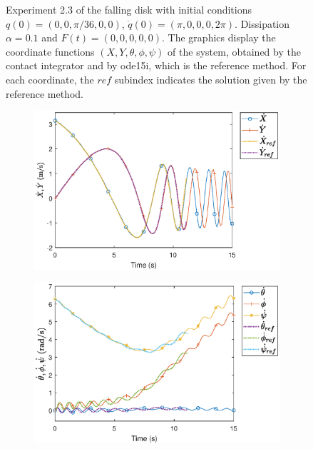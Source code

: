 \documentclass{aims}
\numberwithin{equation}{section}
\theoremstyle{definition}
\begin{document}
\begin{figure}
\begin{subfigure}[b]{0.75\textwidth}
  \end{subfigure}
  \caption{Experiment 2.3 of the falling disk with initial conditions ${q(0) = (0,0,\pi/36,0,0)}$, ${\dot{q}(0) = (\pi,0,0,0,2\pi)}$. Dissipation ${\alpha = 0.1}$ and ${F(t) = (0,0,0,0,0)}$. The graphics display the coordinate functions $(X,Y,\theta,\phi,\psi)$ of the system, obtained by the contact integrator and by ode15i, which is the reference method. For each coordinate, the $ref$ subindex indicates the solution given by the reference method.}
  \label{fig:disco_experimento_2_3_1}
\end{figure}

\begin{figure}
  \centering
  \begin{subfigure}[b]{0.75\textwidth}
    \centering
    \includegraphics[width=\textwidth]{fig/23XdotYdot.eps}
  \end{subfigure}
  \par\bigskip
  \begin{subfigure}[b]{0.75\textwidth}
    \centering
    \includegraphics[width=\textwidth]{fig/23thetadotphidotpsidot.eps}

\end{subfigure}
\end{figure}
\end{document}
